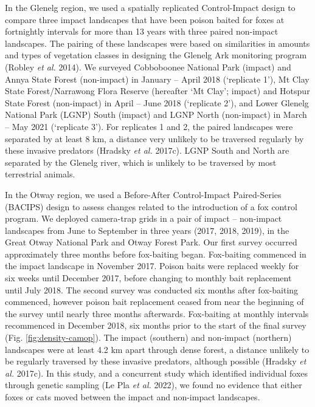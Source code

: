 \documentclass[11pt,a4paper,titlepage,twoside,openright]{style/unimelbthesis}
\begin{document}
\begin{mainmatter}
In the Glenelg region, we used a spatially replicated Control-Impact design to compare three impact landscapes that have been poison baited for foxes at fortnightly intervals for more than 13 years with three paired non-impact landscapes. The pairing of these landscapes were based on similarities in amounts and types of vegetation classes in designing the Glenelg Ark monitoring program (Robley \emph{et al.} 2014). We surveyed Cobboboonee National Park (impact) and Annya State Forest (non-impact) in January -- April 2018 (`replicate 1'), Mt Clay State Forest/Narrawong Flora Reserve (hereafter `Mt Clay'; impact) and Hotspur State Forest (non-impact) in April -- June 2018 (`replicate 2'), and Lower Glenelg National Park (LGNP) South (impact) and LGNP North (non-impact) in March -- May 2021 (`replicate 3'). For replicates 1 and 2, the paired landscapes were separated by at least 8 km, a distance very unlikely to be traversed regularly by these invasive predators (Hradsky \emph{et al.} 2017c). LGNP South and North are separated by the Glenelg river, which is unlikely to be traversed by most terrestrial animals.

In the Otway region, we used a Before-After Control-Impact Paired-Series (BACIPS) design to assess changes related to the introduction of a fox control program. We deployed camera-trap grids in a pair of impact -- non-impact landscapes from June to September in three years (2017, 2018, 2019), in the Great Otway National Park and Otway Forest Park. Our first survey occurred approximately three months before fox-baiting began. Fox-baiting commenced in the impact landscape in November 2017. Poison baits were replaced weekly for six weeks until December 2017, before changing to monthly bait replacement until July 2018. The second survey was conducted six months after fox-baiting commenced, however poison bait replacement ceased from near the beginning of the survey until nearly three months afterwards. Fox-baiting at monthly intervals recommenced in December 2018, six months prior to the start of the final survey (Fig. \ref{fig:density-camop}). The impact (southern) and non-impact (northern) landscapes were at least 4.2 km apart through dense forest, a distance unlikely to be regularly traversed by these invasive predators, although possible (Hradsky \emph{et al.} 2017c). In this study, and a concurrent study which identified individual foxes through genetic sampling (Le Pla \emph{et al.} 2022), we found no evidence that either foxes or cats moved between the impact and non-impact landscapes.


\end{mainmatter}
\end{document}
